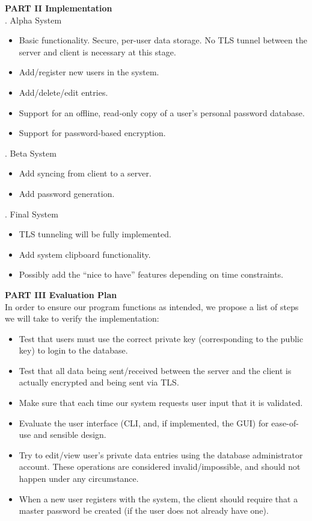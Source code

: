 \documentclass[11pt, letterpaper]{article}
\newcommand{\DesignSection}[1]
{\noindent\textbf{#1}\\}
\begin{document}
\DesignSection{PART II Implementation}
. Alpha System
\begin{itemize} \itemsep1pt \parskip0pt 
    \item Basic functionality. Secure, per-user data storage. No \ac{TLS} tunnel between the server and client is necessary at this stage.
    \item Add/register new users in the system.
    \item Add/delete/edit entries.
    \item Support for an offline, read-only copy of a user’s personal password database.
    \item Support for password-based encryption.
\end{itemize}
. Beta System
\begin{itemize} \itemsep1pt \parskip0pt 
    \item Add syncing from client to a server.
    \item Add password generation.
\end{itemize}
. Final System
\begin{itemize} \itemsep1pt \parskip0pt 
    \item \ac{TLS} tunneling will be fully implemented.
    \item Add system clipboard functionality.
    \item Possibly add the “nice to have” features depending on time constraints.
\end{itemize}

\DesignSection{PART III Evaluation Plan}
\noindent
In order to ensure our program functions as intended, we propose a list of steps we will take to verify the implementation:
\begin{itemize} \itemsep1pt \parskip0pt 
\item Test that users must use the correct private key (corresponding to the public key) to login to the database.
\item Test that all data being sent/received between the server and the client is actually encrypted and being sent via \ac{TLS}.
\item Make sure that each time our system requests user input that it is validated.
\item Evaluate the user interface (\ac{CLI}, and, if implemented, the \ac{GUI}) for ease-of-use and sensible design.
\item Try to edit/view user’s private data  entries using the database administrator account. These operations are considered invalid/impossible, and should not happen under any circumstance.
\item When a new user registers with the system, the client should require that a master password be created (if the user does not already have one).
\end{itemize}
\end{document}
